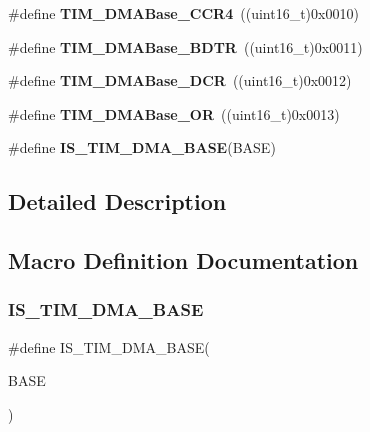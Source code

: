 \begin{DoxyCompactItemize}
\mbox{\label{group___t_i_m___d_m_a___base__address_ga5e84a16e7d8ea369a3a55bb6fe1f2171}} 
\#define {\bfseries T\+I\+M\+\_\+\+D\+M\+A\+Base\+\_\+\+C\+C\+R4}~((uint16\+\_\+t)0x0010)
\item 
\mbox{\label{group___t_i_m___d_m_a___base__address_gaaff22bbf3091c47783c1c68b648c8605}} 
\#define {\bfseries T\+I\+M\+\_\+\+D\+M\+A\+Base\+\_\+\+B\+D\+TR}~((uint16\+\_\+t)0x0011)
\item 
\mbox{\label{group___t_i_m___d_m_a___base__address_ga59e2206e4e03b9d55c9fb5a24e29b01c}} 
\#define {\bfseries T\+I\+M\+\_\+\+D\+M\+A\+Base\+\_\+\+D\+CR}~((uint16\+\_\+t)0x0012)
\item 
\mbox{\label{group___t_i_m___d_m_a___base__address_gad6a75d19df73bae091a0e649fba7339c}} 
\#define {\bfseries T\+I\+M\+\_\+\+D\+M\+A\+Base\+\_\+\+OR}~((uint16\+\_\+t)0x0013)
\item 
\#define {\bfseries I\+S\+\_\+\+T\+I\+M\+\_\+\+D\+M\+A\+\_\+\+B\+A\+SE}(B\+A\+SE)
\end{DoxyCompactItemize}


\subsection{Detailed Description}


\subsection{Macro Definition Documentation}
\mbox{\label{group___t_i_m___d_m_a___base__address_gaf565551f2619b1368fed7ef1ba7414de}} 
\subsubsection{\texorpdfstring{I\+S\+\_\+\+T\+I\+M\+\_\+\+D\+M\+A\+\_\+\+B\+A\+SE}{IS\_TIM\_DMA\_BASE}}
{\footnotesize\ttfamily \#define I\+S\+\_\+\+T\+I\+M\+\_\+\+D\+M\+A\+\_\+\+B\+A\+SE(\begin{DoxyParamCaption}\item[{}]{B\+A\+SE }\end{DoxyParamCaption})}

